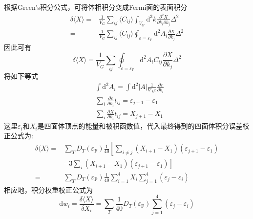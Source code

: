 根据\textrm{Green's}积分公式，可将体相积分变成\textrm{Fermi}面的表面积分
	\begin{equation}
		\begin{aligned}
			\delta\langle X\rangle=&\frac1{V_G}\sum_{ij}\langle C_{ij}\rangle\int_{V_G}\mathrm{d}^3k\frac{\partial^2X}{\partial k_i\partial k_j}\Delta^2\\
			=&\frac1{V_G}\sum_{ij}\langle C_{ij}\rangle\oint_{\varepsilon=\varepsilon_{\mathrm F}}\mathrm{d}^2A_i\frac{\partial X}{\partial k_j}\Delta^2
		\end{aligned}
		\label{eq:kpoint_Tetra_surface}
	\end{equation}
因此可有
	\begin{displaymath}
			\delta\langle X\rangle=\frac1{V_G}\sum_{ij}\oint_{\varepsilon=\varepsilon_{\mathrm F}}\mathrm{d}^2A_iC_{ij}\frac{\partial X}{\partial k_j}\Delta^2
	\end{displaymath}
将如下等式
	\begin{displaymath}
		\begin{aligned}
		&\int\mathrm{d}^2A_i=\int\mathrm{d}^2|A|\frac1{\nabla_k\varepsilon}\frac{\partial\varepsilon}{\partial k_i}\\
		&\sum_i\frac{\partial\varepsilon}{\partial k_i}t_{ij}=\varepsilon_{j+1}-\varepsilon_1\\
		&\sum_i\frac{\partial X}{\partial k_i}t_{ij}=X_{j+1}-X_1 
		\end{aligned}
	\end{displaymath}
这里$\varepsilon_i$和$X_i$是四面体顶点的能量和被积函数值，代入最终得到的四面体积分误差校正公式为:~
\begin{equation}
	\begin{aligned}
		\delta\langle X\rangle=&\sum_TD_T(\varepsilon_{\mathrm F})\frac1{40}\left[\sum_{i\neq j}(X_{i+1}-X_1)(\varepsilon_{j+1}-\varepsilon_1)\right.\\
			&-3\left.\sum_i(X_{i+1}-X_1)(\varepsilon_{j+1}-\varepsilon_1)\right]\\
			=&\sum_TD_T(\varepsilon_{\mathrm F})\frac1{40}\sum_{i=1}^4X_i\sum_{j=1}^4(\varepsilon_j-\varepsilon_i) 
	\end{aligned}
	\label{eq:kpoint_Tetra_blochl-error}
\end{equation}
相应地，积分权重校正公式为
\begin{equation}
	\mathrm{d}w_i=\frac{\delta\langle X\rangle}{\delta X_i}=\sum_T\frac1{40}D_T(\varepsilon_{\mathrm F})\sum_{j=1}^4(\varepsilon_j-\varepsilon_i) 
	\label{eq:kpoint_Tetra_blochl-weighterror}
\end{equation}

